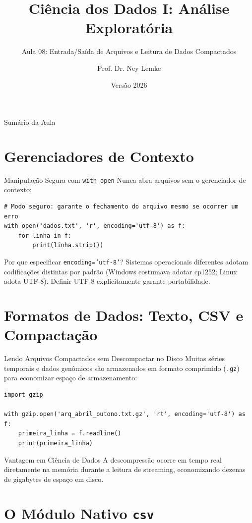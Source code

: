 \documentclass[aspectratio=169, 10pt]{beamer}
\title[Aula 08 - I/O de Arquivos]{Ciência dos Dados I: Análise Exploratória}
\subtitle{Aula 08: Entrada/Saída de Arquivos e Leitura de Dados Compactados}
\author{Prof. Dr. Ney Lemke}
\institute{UNESP -- Instituto de Biociências de Botucatu}
\date{Versão 2026}
\begin{document}
\frame{\titlepage}

\begin{frame}{Sumário da Aula}
  \tableofcontents
\end{frame}

\section{Gerenciadores de Contexto}

\begin{frame}[fragile]{Manipulação Segura com \texttt{with open}}
  Nunca abra arquivos sem o gerenciador de contexto:
  \begin{lstlisting}
# Modo seguro: garante o fechamento do arquivo mesmo se ocorrer um erro
with open('dados.txt', 'r', encoding='utf-8') as f:
    for linha in f:
        print(linha.strip())
  \end{lstlisting}
  \begin{block}{Por que especificar \texttt{encoding='utf-8'}?}
    Sistemas operacionais diferentes adotam codificações distintas por padrão (Windows costumava adotar cp1252; Linux adota UTF-8). Definir UTF-8 explicitamente garante portabilidade.
  \end{block}
\end{frame}

\section{Formatos de Dados: Texto, CSV e Compactação}

\begin{frame}[fragile]{Lendo Arquivos Compactados sem Descompactar no Disco}
  Muitas séries temporais e dados genômicos são armazenados em formato comprimido (\texttt{.gz}) para economizar espaço de armazenamento:
  \begin{lstlisting}
import gzip

with gzip.open('arq_abril_outono.txt.gz', 'rt', encoding='utf-8') as f:
    primeira_linha = f.readline()
    print(primeira_linha)
  \end{lstlisting}
  \begin{exampleblock}{Vantagem em Ciência de Dados}
    A descompressão ocorre em tempo real diretamente na memória durante a leitura de streaming, economizando dezenas de gigabytes de espaço em disco.
  \end{exampleblock}
\end{frame}

\section{O Módulo Nativo \texttt{csv}}
\end{document}
